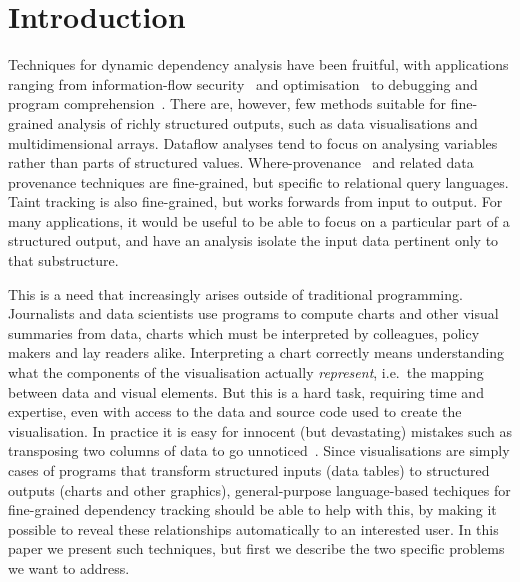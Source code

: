 \section{Introduction}
\label{sec:introduction}

Techniques for dynamic dependency analysis have been fruitful, with applications ranging from information-flow security~\cite{sabelfeld03} and optimisation~\cite{kildall73} to debugging and program comprehension~\cite{weiser81,delucia96}. There are, however, few methods suitable for fine-grained analysis of richly structured outputs, such as data visualisations and multidimensional arrays. Dataflow analyses \cite{reps95} tend to focus on analysing variables rather than parts of structured values. Where-provenance~\cite{buneman01} and related data provenance techniques are fine-grained, but specific to relational query languages. Taint tracking \cite{newsome05} is also fine-grained, but works forwards from input to output. For many applications, it would be useful to be able to focus on a particular part of a structured output, and have an analysis isolate the input data pertinent only to that substructure.

This is a need that increasingly arises outside of traditional programming. Journalists and data scientists use programs to compute charts and other visual summaries from data, charts which must be interpreted by colleagues, policy makers and lay readers alike. Interpreting a chart correctly means understanding what the components of the visualisation actually \emph{represent}, i.e.~the mapping between data and visual elements. But this is a hard task, requiring time and expertise, even with access to the data and source code used to create the visualisation. In practice it is easy for innocent (but devastating) mistakes such as transposing two columns of data to go unnoticed~\cite{miller06}. Since visualisations are simply cases of programs that transform structured inputs (data tables) to structured outputs (charts and other graphics), general-purpose language-based techiques for fine-grained dependency tracking should be able to help with this, by making it possible to reveal these relationships automatically to an interested user. In this paper we present such techniques, but first we describe the two specific problems we want to address.

